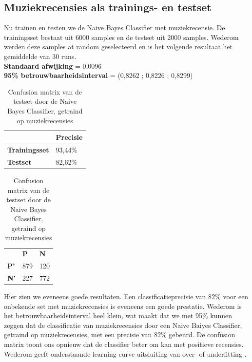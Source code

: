 \begin{appendices}
\subsection{Muziekrecensies als trainings- en testset}\label{Muziek als trainings- en testset}

Nu trainen en testen we de Naive Bayes Classifier met muziekrecensie. De trainingsset bestaat uit 6000 samples en de testset uit 2000 samples. Wederom werden deze samples at random geselecteerd en is het volgende resultaat het gemiddelde van 30 runs.\\

\textbf{Standaard afwijking} = 0,0096\\
\textbf{95\% betrouwbaarheidsinterval} = (0,8262 ; 0,8226 ; 0,8299)\\
 
\begin{table}[h]
\centering
\setlength\tabcolsep{4pt}
\begin{minipage}[t]{0.48\textwidth}
\centering
\begin{tabular}{l|l|}
\cline{2-2}
                                            & \textbf{Precisie} \\ \hline
\multicolumn{1}{|l|}{\textbf{Trainingsset}} & 93,44\%           \\ \hline
\multicolumn{1}{|l|}{\textbf{Testset}}      & 82,62\%           \\ \hline
\end{tabular}
\caption{Classificatieprecisie Naive Bayes Classifier, getraind op muziekrecensies}
\end{minipage}%
\hfill
\begin{minipage}[t]{0.48\textwidth}
\centering
\begin{tabular}{lll}
                                 & \textbf{P}               & \textbf{N}               \\ \cline{2-3} 
\multicolumn{1}{l|}{\textbf{P'}} & \multicolumn{1}{l|}{879} & \multicolumn{1}{l|}{120} \\ \cline{2-3} 
\multicolumn{1}{l|}{\textbf{N'}} & \multicolumn{1}{l|}{227} & \multicolumn{1}{l|}{772} \\ \cline{2-3} 
\end{tabular}
\caption{Confusion matrix van de testset door de  Naive Bayes Classifier, getraind op muziekrecensies} 
\end{minipage}
\end{table}

Hier zien we eveneens goede resultaten. Een classificatieprecisie van 82\% voor een onbekende set met muziekrecensies is eveneens een goede prestatie. Wederom is het betrouwbaarheidsinterval heel klein, wat maakt dat we met 95\% kunnen zeggen dat de classificatie van muziekrecensies door een Naive Baiyes Classifier, getraind op muziekrecensies, met een precisie van 82\% gebeurd. De confusion matrix toont ons opnieuw dat de classifier beter om kan met positieve recensies.
%
Wederom geeft onderstaande learning curve uitsluiting van over- of underfitting .


\end{appendices}
